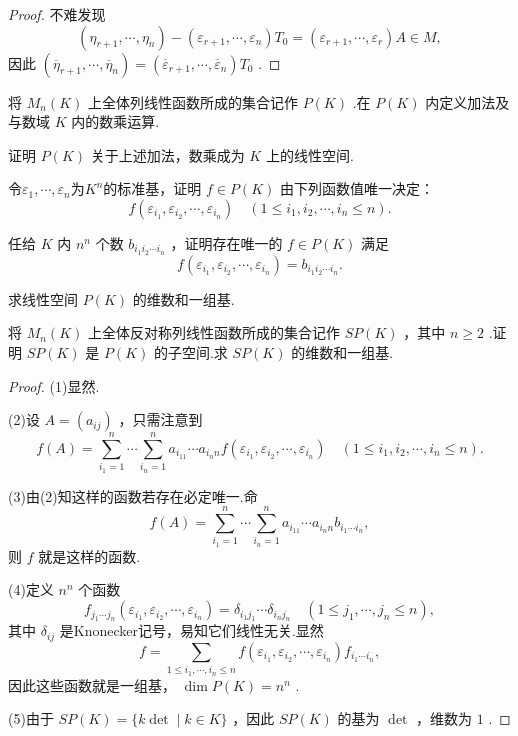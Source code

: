 \begin{proof}
	不难发现
	\[
		(\eta_{r+1},\cdots,\eta_n)-(\varepsilon_{r+1},\cdots,\varepsilon_n)T_0=(\varepsilon_{r+1},\cdots,\varepsilon_r)A\in M,
	\]
	因此 $(\overline{\eta}_{r+1},\cdots,\overline{\eta}_n)=(\overline{\varepsilon}_{r+1},\cdots,\overline{\varepsilon}_n	)T_0$ .
\end{proof}
\begin{prob}[28]
	将 $M_n(K)$ 上全体列线性函数所成的集合记作 $P(K)$ .在 $P(K)$ 内定义加法及与数域 $K$ 内的数乘运算.
	\begin{mylist}
		\item 证明 $P(K)$ 关于上述加法，数乘成为 $K$ 上的线性空间.
		\item 令$\varepsilon_1,\cdots,\varepsilon_n$为$K^n$的标准基，证明 $f\in P(K)$ 由下列函数值唯一决定：
		\[
			f(\varepsilon_{i_1},\varepsilon_{i_2},\cdots,\varepsilon_{i_n})\quad(1\le i_1,i_2,\cdots,i_n\le n).
		\]
		\item 任给 $K$ 内 $n^n$ 个数 $b_{i_1i_2\cdots i_n}$ ，证明存在唯一的 $f\in P(K)$ 满足
		\[
			f(\varepsilon_{i_1},\varepsilon_{i_2},\cdots,\varepsilon_{i_n})=b_{i_1i_2\cdots i_n}.
		\]
		\item 求线性空间 $P(K)$ 的维数和一组基.
		\item 将 $M_n(K)$ 上全体反对称列线性函数所成的集合记作 $SP(K)$ ，其中 $n\ge 2$ .证明 $SP(K)$ 是 $P(K)$ 的子空间.求 $SP(K)$ 的维数和一组基.
	\end{mylist}
\end{prob}
\begin{proof}
	(1)显然.

	(2)设 $A=(a_{ij})$ ，只需注意到
	\[
		f(A)=\sum_{i_1=1}^{n}\cdots\sum_{i_n=1}^{n}a_{i_11}\cdots a_{i_nn}f(\varepsilon_{i_1},\varepsilon_{i_2},\cdots,\varepsilon_{i_n})\quad(1\le i_1,i_2,\cdots,i_n\le n).
	\]

	(3)由(2)知这样的函数若存在必定唯一.命
	\[
		f(A)=\sum_{i_1=1}^{n}\cdots\sum_{i_n=1}^{n}a_{i_11}\cdots a_{i_nn}b_{i_1\cdots i_n},
	\]
	则 $f$ 就是这样的函数.

	(4)定义 $n^n$ 个函数
	\[
		f_{j_1\cdots j_n}(\varepsilon_{i_1},\varepsilon_{i_2},\cdots,\varepsilon_{i_n})=\delta_{i_1j_1}\cdots\delta_{i_nj_n}\quad(1\le j_1,\cdots,j_n\le n),
	\]
	其中 $\delta_{ij}$ 是Knonecker记号，易知它们线性无关.显然
	\[
		f=\sum_{1\le i_1,\cdots,i_n\le n}f(\varepsilon_{i_1},\varepsilon_{i_2},\cdots,\varepsilon_{i_n})f_{i_1\cdots i_n},
	\]
	因此这些函数就是一组基， $\dim P(K)=n^n$ .

	(5)由于 $SP(K)=\{k\det \mid k\in K\}$ ，因此 $SP(K)$ 的基为 $\det$ ，维数为 $1$ .
\end{proof}
